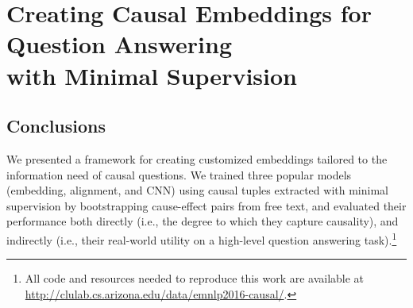 
\chapter{Creating Causal Embeddings for Question Answering \\with Minimal Supervision \label{chapter:emnlp2016}}



%
%







\section{Conclusions}
\label{sec-emnlp2016:conclusion}
We presented a framework for creating customized embeddings tailored to the information need of causal questions.  We trained three popular models (embedding, alignment, and CNN) using causal tuples extracted with minimal supervision by bootstrapping cause-effect pairs from free text, and evaluated their performance both directly (i.e., the degree to which they capture causality), and indirectly (i.e., their real-world utility on a high-level question answering task).\footnote{All code and resources needed to reproduce this work are  available at \url{http://clulab.cs.arizona.edu/data/emnlp2016-causal/}.} 


